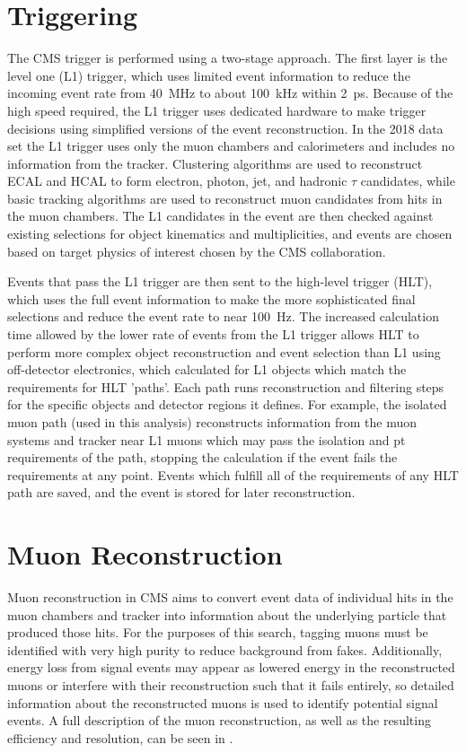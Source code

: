 \section{Triggering}
The CMS trigger is performed using a two-stage approach. The first layer is the level one (L1) trigger, which uses limited event information to reduce the incoming event rate from \SI{40}{\mega\hertz} to about \SI{100}{\kilo\hertz} within \SI{2}{\pico\second}. 
Because of the high speed required, the L1 trigger uses dedicated hardware to make trigger decisions using simplified versions of the event reconstruction.
In the 2018 data set the L1 trigger uses only the muon chambers and calorimeters and includes no information from the tracker.
Clustering algorithms are used to reconstruct ECAL and HCAL to form electron, photon, jet, and hadronic $\tau$ candidates, while basic tracking algorithms are used to reconstruct muon candidates from hits in the muon chambers.
The L1 candidates in the event are then checked against existing selections for object kinematics and multiplicities, and events are chosen based on target physics of interest chosen by the CMS collaboration.

Events that pass the L1 trigger are then sent to the high-level trigger (HLT), which uses the full event information to make the more sophisticated final selections and reduce the event rate to near \SI{100}{\hertz}.
The increased calculation time allowed by the lower rate of events from the L1 trigger allows HLT to perform more complex object reconstruction and event selection than L1 using off-detector electronics, which calculated for L1 objects which match the requirements for HLT 'paths'.
Each path runs reconstruction and filtering steps for the specific objects and detector regions it defines.
For example, the isolated muon path (used in this analysis) reconstructs information from the muon systems and tracker near L1 muons which may pass the isolation and pt requirements of the path, stopping the calculation if the event fails the requirements at any point.
Events which fulfill all of the requirements of any HLT path are saved, and the event is stored for later reconstruction.

\section{Muon Reconstruction}
\label{sec:muonReco}
Muon reconstruction in CMS aims to convert event data of individual hits in the muon chambers and tracker into information about the underlying particle that produced those hits.
For the purposes of this search, tagging muons must be identified with very high purity to reduce background from fakes. 
Additionally, energy loss from signal events may appear as lowered energy in the reconstructed muons or interfere with their reconstruction such that it fails entirely, so detailed information about the reconstructed muons is used to identify potential signal events.
A full description of the muon reconstruction, as well as the resulting efficiency and resolution, can be seen in \cite{cmsMuonPerformance}.

